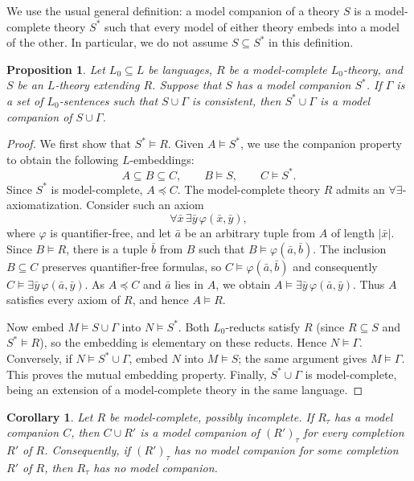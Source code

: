 \documentclass[11pt,a4paper]{amsart}
\newtheorem{proposition}[theorem]{Proposition}
\newtheorem{corollary}[theorem]{Corollary}
\theoremstyle{definition}
\begin{document}
We use the usual general definition: a model companion of a theory $S$ is a
model-complete theory $S^*$ such that every model of either theory
embeds into a model of the other. In particular, we do not assume
$S\subseteq S^*$ in this definition.

\begin{proposition}\label{mc:prop:transfer}
Let $L_0\subseteq L$ be languages, $R$ be a model-complete $L_0$-theory,
and $S$ be an $L$-theory extending $R$. Suppose that $S$ has
a model companion $S^*$. If $\Gamma$ is a set of $L_0$-sentences
such that $S\cup\Gamma$ is consistent, then $S^*\cup\Gamma$ is
a model companion of $S\cup\Gamma$.
\end{proposition}

\begin{proof}
We first show that $S^*\models R$. Given $A\models S^*$, we use the
companion property to obtain the following $L$-embeddings:
\[
  A\subseteq B\subseteq C,
  \qquad B\models S,\qquad C\models S^*.
\]
Since $S^*$ is model-complete, $A\preccurlyeq C$. The
model-complete theory $R$ admits an $\forall\exists$-axiomatization.
Consider such an axiom
\[
\forall\bar x\,\exists\bar y\,\varphi(\bar x,\bar y),
\]
where $\varphi$ is quantifier-free, and let $\bar a$ be an arbitrary tuple
from $A$ of length $|\bar x|$. Since $B\models R$, there is a tuple $\bar b$ from $B$
such that $B\models\varphi(\bar a,\bar b)$. The inclusion $B\subseteq C$ preserves quantifier-free formulas,
so $C\models\varphi(\bar a,\bar b)$ 
and consequently $C\models\exists\bar y\,\varphi(\bar a,\bar y)$.
As $A\preccurlyeq C$ and $\bar a$ lies in $A$, we obtain
$A\models\exists\bar y\,\varphi(\bar a,\bar y)$. Thus $A$ satisfies every axiom of $R$, and hence $A\models R$.

Now embed $M\models S\cup\Gamma$ into $N\models S^*$. Both
$L_0$-reducts satisfy $R$ (since $R\subseteq S$ and $S^*\models R$), so the embedding is elementary on these
reducts. Hence $N\models\Gamma$. Conversely, if
$N\models S^*\cup\Gamma$, embed $N$ into $M\models S$; the
same argument gives $M\models\Gamma$. This proves the mutual
embedding property. Finally, $S^*\cup\Gamma$ is model-complete,
being an extension of a model-complete theory in the same language.
\end{proof}

\begin{corollary}\label{mc:cor:completions}
Let $R$ be model-complete, possibly incomplete. If $R_\tau$ has
a model companion $C$, then $C\cup R'$ is a model companion of
$(R')_\tau$ for every completion $R'$ of $R$. Consequently, if
$(R')_\tau$ has no model companion for some completion $R'$ of
$R$, then $R_\tau$ has no model companion.
\end{corollary}
\end{document}
